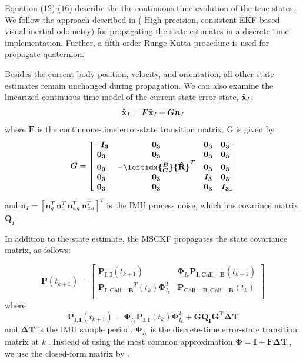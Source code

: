 \documentclass[a4paper, 10pt, conference]{ieeeconf}      %
\begin{document}
Equation ($12$)-($16$) describe the the continuous-time evolution of the true states. 
We follow the approach described in  ( High-precision, consistent EKF-based visual-inertial odometry) for propagating the state estimates in a discrete-time implementation. Further, a fifth-order
Runge-Kutta procedure is used for propagate quaternion.

 Besides the current body position, velocity, and orientation, all other state estimates remain unchanged during propagation. We can also examine the linearized continuous-time model of the current state error state, $ {{\tilde{\textbf x}}_{I}} $:
\begin{equation}
{\dot{\tilde{\textbf x}}_{I}} =  \bm F{\tilde{\textbf x}}_{I}+\bm G \bm n_I
\end{equation}
where $ \bm F $ is the continuous-time error-state transition matrix. G is given by
\begin{equation}
\bm G = \left[\begin{matrix}  
- \bm {I_{3}} & \bm {0_{3}} & \bm {0_{3}} &\bm {0_{3}} \\
\bm {0_{3}} & \bm {0_{3}} & \bm {0_{3}} &\bm {0_{3}} \\
\bm {0_{3}} & - \bm {\leftidx{_G^B}{\hat {\textbf R}}^T} & \bm {0_{3}} &\bm {0_{3}} \\
\bm {0_{3}} & \bm {0_{3}} & \bm {I_{3}} &\bm {0_{3}} \\
\bm {0_{3}} & \bm {0_{3}} & \bm {0_{3}} &\bm {I_{3}} 
\end{matrix}  \right] 
\end{equation}
and $ \bm n_I = [\bm n_g^T \ \bm n_{a}^T \  \bm n_{wg}^T \ \bm n_{wa}^T]^T $ is the IMU process noise, which has covarince matrix $ \bm Q_I $.

In addition to the state estimate, the MSCKF propagates the state covariance matrix, as follows:

\begin{equation}
\bm{P}(t_{k+1})= \left[  \begin{matrix} 
\bm{P_{I,I}}(t_{k+1})  & 
\bm {\Phi}_{I_k}\bm{P_{I,Cali-B}}(t_{k+1}) \\
\bm{P_{I,Cali-B}}^T(t_k) \bm {\Phi}_{I_k}^T & \bm{P_{Cali-B,Cali-B}}(t_k)  \\
\end{matrix}   \right] 
\end{equation}
where
\begin{equation}
\bm{P_{I,I}}(t_{k+1})= \bm {\Phi}_{I_k}\bm{P_{I,I}}(t_{k}) \bm {\Phi}_{I_k}^T+\bm {G{Q_I}G^T\Delta T}
\end{equation}
and $ \bm {\Delta T} $ is the IMU sample period. $ \bm {\Phi}_{I_k} $ is the discrete-time error-state transition matrix at \emph k . Instead of using the most common approximation $ \bm \Phi = \bm I + \bm F\bm {\Delta T} \ $, we use the closed-form matrix by \cite{li2013high}.
\end{document}
